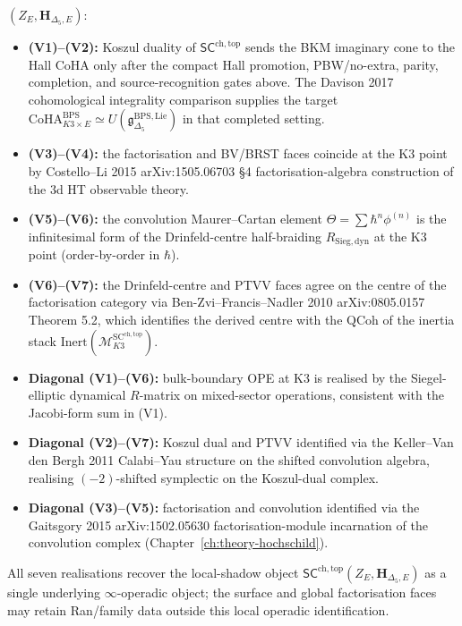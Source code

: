 \begin{theorem}
$(Z_E,\mathbf H_{\Delta_5,E})$:
\begin{itemize}
 \item \textbf{(V1)--(V2):} Koszul duality of $\mathsf{SC}^{\mathrm{ch,top}}$
 sends the BKM imaginary cone to the Hall CoHA only after the compact
 Hall promotion, PBW/no-extra, parity, completion, and
 source-recognition gates above. The Davison 2017 cohomological
 integrality comparison supplies the target
 $\mathrm{CoHA}_{K3 \times E}^{\mathrm{BPS}}
 \simeq U(\mathfrak{g}_{\Delta_5}^{\mathrm{BPS,Lie}})$ in that
 completed setting.
 \item \textbf{(V3)--(V4):} the factorisation and BV/BRST faces coincide
 at the K3 point by Costello--Li 2015 arXiv:1505.06703 \S 4
 factorisation-algebra construction of the $3$d HT observable theory.
 \item \textbf{(V5)--(V6):} the convolution Maurer--Cartan element
 $\Theta = \sum \hbar^n \phi^{(n)}$ is the infinitesimal form of the
 Drinfeld-centre half-braiding $R_{\mathrm{Sieg,dyn}}$ at the K3 point
 (order-by-order in $\hbar$).
 \item \textbf{(V6)--(V7):} the Drinfeld-centre and PTVV faces agree on
 the centre of the factorisation category via Ben-Zvi--Francis--Nadler
 2010 arXiv:0805.0157 Theorem 5.2, which identifies the derived centre
 with the $\mathrm{QCoh}$ of the inertia stack
 $\mathrm{Inert}(\mathcal{M}^{\mathrm{SC}^{\mathrm{ch,top}}}_{K3})$.
 \item \textbf{Diagonal (V1)--(V6):} bulk-boundary OPE at K3 is realised by
 the Siegel-elliptic dynamical $R$-matrix on mixed-sector operations,
 consistent with the Jacobi-form sum in (V1).
 \item \textbf{Diagonal (V2)--(V7):} Koszul dual and PTVV identified via
 the Keller--Van den Bergh 2011 Calabi--Yau structure on the shifted
 convolution algebra, realising $(-2)$-shifted symplectic on the
 Koszul-dual complex.
 \item \textbf{Diagonal (V3)--(V5):} factorisation and convolution
 identified via the Gaitsgory 2015 arXiv:1502.05630 factorisation-module
 incarnation of the convolution complex (Chapter~\ref{ch:theory-hochschild}).
\end{itemize}
All seven realisations recover the local-shadow object
$\mathsf{SC}^{\mathrm{ch,top}}(Z_E,\mathbf H_{\Delta_5,E})$ as a single
underlying $\infty$-operadic object; the surface and global
factorisation faces may retain Ran/family data outside this local
operadic identification.
\end{theorem}

